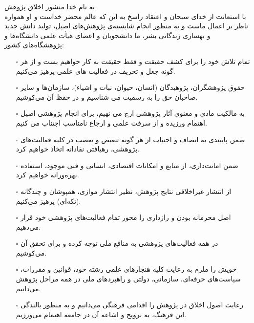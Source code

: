 {\nastaliq\bfseries \fontsize{10}{11}\selectfont
\begin{center}
به نام خدا
	\vskip 2mm
منشور اخلاق پژوهش\\
	\vskip 2mm
با استعانت از خدای سبحان و اعتقاد راسخ به این که عالم محضر خداست و او همواره ناظر بر اعمال ماست و به منظور انجام شایسته‌ی پژوهش‌های اصیل، تولید دانش جدید و بهسازی زندگانی بشر، ما دانشجویان و اعضای هیأت علمی دانشگاه‌ها و پژوهشگاه‌های کشور:
\end{center}
\begin{itemize}
\item[$\square$]
تمام تلاش خود را برای کشف حقیقت و فقط حقیقت به کار خواهیم بست و از هر گونه جعل و تحریف در فعالیت های علمی پرهیز می‌کنیم.
\item[$\square$]
حقوق پژوهشگران، پژوهیدگان (انسان، حیوان، نبات و اشیاء)، سازمان‌ها و سایر صاحبان حق را به رسمیت می شناسیم و در حفظ آن می‌کوشیم.
\item[$\square$]
به مالکیت مادي و معنوي آثار پژوهشی ارج می نهیم، برای انجام پژوهشی اصیل اهتمام ورزیده و از سرقت علمی و ارجاع نامناسب اجتناب می کنیم.
\item[$\square$]
ضمن پایبندی به انصاف و اجتباب از هر گونه تبعیض و تعصب در کلیه فعالیت‌های پژوهشی، رهیافتی نقادانه اتخاذ خواهیم کرد.
\item[$\square$]
ضمن امانت‌داری، از منابع و امکانات اقتصادی، انسانی و فنی موجود، استفاده بهره‌ورانه خواهیم کرد.
\item[$\square$]
از انتشار غیراخلاقی نتایج پژوهش، نظیر انتشار موازی، همپوشان و چندگانه (تکه‌ای) پرهیز می‌کنیم.
\item[$\square$]
اصل محرمانه بودن و رازداری را محور تمام فعالیت‌های پژوهشی خود قرار می‌دهیم.
\item[$\square$]
در همه فعالیت‌های پژوهشی به منافع ملی توجه کرده و برای تحقق آن می‌کوشیم.
\item[$\square$]
خویش را ملزم به رعایت کلیه هنجارهای علمی رشته خود، قوانین و مقررات، سیاست‌های حرفه‌ای، سازمانی، دولتی و راهبردهای ملی در همه مراحل پژوهش می‌دانیم.
\item[$\square$]
رعایت اصول اخلاق در پژوهش را اقدامی فرهنگی می‌دانیم و به منظور بالندگی این فرهنگ، به ترویج و اشاعه آن در جامعه اهتمام می‌ورزیم.
\end{itemize}
}